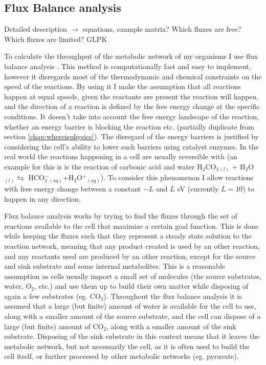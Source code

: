 \documentclass[10pt,a4paper]{article}
\begin{document}
\subsection{Flux Balance analysis}
\label{sub:Flux Balance analysis}

Detailed description $\rightarrow$ equations, example matrix? Which fluxes are free? Which fluxes are limited? GLPK 



	To calculate the throughput of the metabolic network of my organisms I use flux balance analysis \cite{whatisfluxbalance}. This method is computationally fast and easy to implement, however it disregards most of the thermodynamic and chemical constraints on the speed of the reactions. By using it I make the assumption that all reactions happen at equal speeds, given the reactants are present the reaction will happen, and the direction of a reaction is defined by the free energy change at the specific conditions. It doesn't take into account the free energy landscape of the reaction, whether an energy barrier is blocking the reaction etc. (partially duplicate from section \ref{chap:whereisphysics}). The disregard of the energy barriers is justified by considering the cell's ability to lower such barriers using catalyst enzymes. In the real world the reactions happening in a cell are usually reversible with (an example for this is is the reaction of carbonic acid and water H$_2$CO$_3$$_{(l)}$ + H$_2$O$_{(l)} \leftrightarrows$ HCO$^-_3$$_{(aq)}$+H$_3$O$^+$$_{(aq)}$). To consider this phenomenon I allow reactions with free energy change between a constant $-L$ and $L$ eV (currently $L=10$) to happen in any direction. 
	
	Flux balance analysis works by trying to find the fluxes through the set of reactions available to the cell that maximize a certain goal function. This is done while keeping the fluxes such that they represent a steady state solution to the reaction network, meaning that any product created is used by an other reaction, and any reactants used are produced by an other reaction, except for the source and sink substrate and some internal metabolites. This is a reasonable assumption as cells usually import a small set of molecules (the source substrates, water, O$_2$, etc.) and use them up to build their own matter while disposing of again a few substrates (eg. CO$_2$). Throughout the flux balance analysis it is assumed that a large (but finite) amount of water is available for the cell to use, along with a smaller amount of the source substrate, and the cell can dispose of a large (but finite) amount of CO$_2$, along with a smaller amount of the sink substrate. Disposing of the sink substrate in this context means that it leaves the metabolic network, but not necessarily the cell, as it is often used to build the cell itself, or further processed by other metabolic networks (eg. pyruvate).
	
\end{document}
